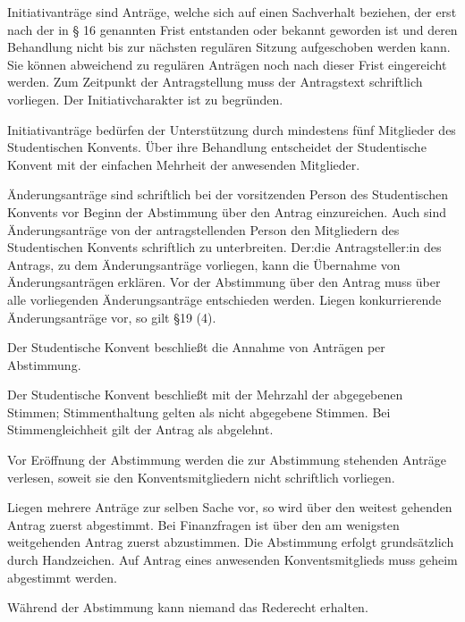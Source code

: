 \documentclass[10pt,a4paper]{scrartcl}
\begin{document}
\begin{contract}
\label{initiativantruxe4ge}

Initiativanträge sind Anträge, welche sich auf einen Sachverhalt beziehen, der
erst nach der in § 16 genannten Frist entstanden oder bekannt geworden ist und
deren Behandlung nicht bis zur nächsten regulären Sitzung aufgeschoben werden
kann. Sie können abweichend zu regulären Anträgen noch nach dieser Frist
eingereicht werden. Zum Zeitpunkt der Antragstellung muss der Antragstext
schriftlich vorliegen. Der Initiativcharakter ist zu begründen.

Initiativanträge bedürfen der Unterstützung durch mindestens fünf Mitglieder des
Studentischen Konvents. Über ihre Behandlung entscheidet der Studentische
Konvent mit der einfachen Mehrheit der anwesenden Mitglieder.

\label{uxe4nderungsantruxe4ge}

Änderungsanträge sind schriftlich bei der vorsitzenden Person des
Studentischen Konvents vor Beginn der Abstimmung über den Antrag
einzureichen. Auch sind Änderungsanträge von der antragstellenden Person
den Mitgliedern des Studentischen Konvents schriftlich zu unterbreiten.
Der:die Antragsteller:in des Antrags, zu dem Änderungsanträge vorliegen,
kann die Übernahme von Änderungsanträgen erklären. Vor der Abstimmung
über den Antrag muss über alle vorliegenden Änderungsanträge entschieden
werden. Liegen konkurrierende Änderungsanträge vor, so gilt §19 (4).


\label{abstimmungen}

Der Studentische Konvent beschließt die Annahme von Anträgen per
Abstimmung.

Der Studentische Konvent beschließt mit der Mehrzahl der abgegebenen
Stimmen; Stimmenthaltung gelten als nicht abgegebene Stimmen. Bei
Stimmengleichheit gilt der Antrag als abgelehnt.

Vor Eröffnung der Abstimmung werden die zur Abstimmung stehenden
Anträge verlesen, soweit sie den Konventsmitgliedern nicht schriftlich
vorliegen.

Liegen mehrere Anträge zur selben Sache vor, so wird über den weitest
gehenden Antrag zuerst abgestimmt. Bei Finanzfragen ist über den am
wenigsten weitgehenden Antrag zuerst abzustimmen. Die Abstimmung
erfolgt grundsätzlich durch Handzeichen. Auf Antrag eines anwesenden
Konventsmitglieds muss geheim abgestimmt werden.

Während der Abstimmung kann niemand das Rederecht erhalten.


\end{contract}
\end{document}
